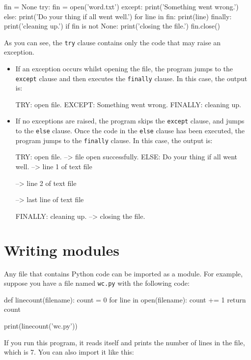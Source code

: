 \beforeverb
\begin{pycode}
fin = None
try:    
    fin = open('word.txt')
except:
    print('Something went wrong.')
else:
    print('Do your thing if all went well.')
    for line in fin:
        print(line)    
finally:
    print('cleaning up.')
    if fin is not None:
        print('closing the file.')
        fin.close()
\end{pycode}
\afterverb

As you can see, the {\tt try} clause contains only the code that may raise an exception. 
\begin{itemize}
	\item If an exception occurs whilst opening the file, the program jumps to the {\tt except} clause and then executes the {\tt finally} clause. In this case, the output is: 

\begin{pyoutput}
TRY: open file.
EXCEPT: Something went wrong.
FINALLY: cleaning up.
\end{pyoutput}

	\item If no exceptions are raised, the program skips the {\tt except} clause, and jumps to the {\tt else} clause. Once the code in the {\tt else} clause has been executed, the program jumps to the {\tt finally} clause. In this case, the output is: 

\begin{pyoutput}
TRY: open file.
--> file open successfully.
ELSE: Do your thing if all went well.
--> line 1 of text file

--> line 2 of text file

--> last line of text file

FINALLY: cleaning up.
--> closing the file.
\end{pyoutput}

\end{itemize} 

\section{Writing modules}
\label{modules}


Any file that contains Python code can be imported as a module.
For example, suppose you have a file named {\tt wc.py} with the following
code:

\beforeverb
\begin{pycode}
def linecount(filename):
    count = 0
    for line in open(filename):
        count += 1
    return count

print(linecount('wc.py'))
\end{pycode}
\afterverb
%
If you run this program, it reads itself and prints the number
of lines in the file, which is 7.
You can also import it like this:

